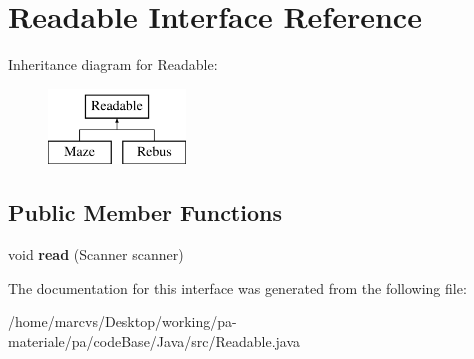 \hypertarget{interfaceReadable}{
\section{Readable Interface Reference}
\label{interfaceReadable}
}
Inheritance diagram for Readable:\begin{figure}[H]
\begin{center}
\leavevmode
\includegraphics[height=2.000000cm]{interfaceReadable}
\end{center}
\end{figure}
\subsection*{Public Member Functions}
\begin{DoxyCompactItemize}
\item 
\hypertarget{interfaceReadable_a4ff1529890f69b2ad321bc06e497ed16}{
void {\bfseries read} (Scanner scanner)}
\label{interfaceReadable_a4ff1529890f69b2ad321bc06e497ed16}

\end{DoxyCompactItemize}


The documentation for this interface was generated from the following file:\begin{DoxyCompactItemize}
\item 
/home/marcvs/Desktop/working/pa-\/materiale/pa/codeBase/Java/src/Readable.java\end{DoxyCompactItemize}
